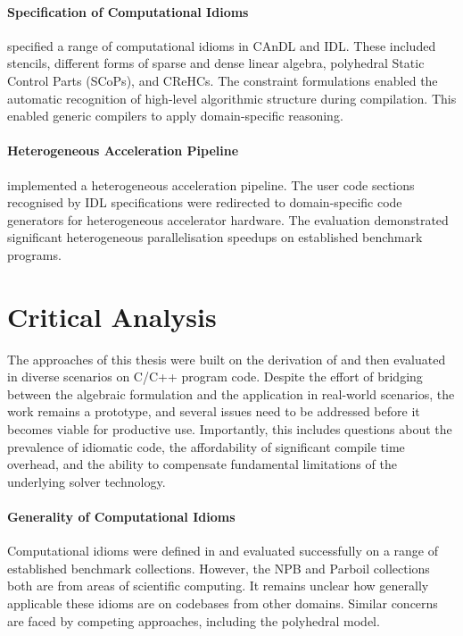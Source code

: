     \paragraph*{Specification of Computational Idioms}
     specified a range of
    computational idioms in CAnDL and IDL.
    These included stencils, different forms of sparse and dense linear algebra,
    polyhedral Static Control Parts (SCoPs), and CReHCs.
    The constraint formulations enabled the automatic recognition of high-level
    algorithmic structure during compilation.
    This enabled generic compilers to apply domain-specific reasoning.

\paragraph*{Heterogeneous Acceleration Pipeline}

     implemented a heterogeneous acceleration pipeline.
    The user code sections recognised by IDL specifications were redirected to
    domain-specific code generators for heterogeneous accelerator hardware.
    The evaluation demonstrated significant heterogeneous parallelisation
    speedups on established benchmark programs.

\section{Critical Analysis}

    The approaches of this thesis were built on the derivation of
     and then evaluated in diverse scenarios on C/C++
    program code.
    Despite the effort of bridging between the algebraic formulation and the
    application in real-world scenarios, the work remains a prototype, and
    several issues need to be addressed before it becomes viable for productive
    use.
    Importantly, this includes questions about the prevalence of idiomatic code,
    the affordability of significant compile time overhead, and the ability to
    compensate fundamental limitations of the underlying solver technology.

\paragraph*{Generality of Computational Idioms}  

    Computational idioms were defined in
     and
    evaluated successfully on a range of established benchmark collections.
    However, the NPB and Parboil collections both are from areas of scientific
    computing.
    It remains unclear how generally applicable these idioms are on codebases
    from other domains.
    Similar concerns are faced by competing approaches, including the
    polyhedral model.

